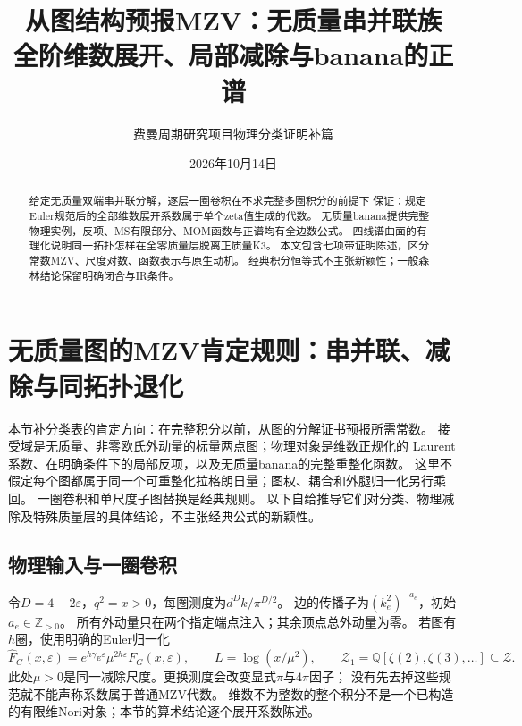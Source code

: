 \documentclass[11pt,a4paper]{ctexart}
\title{从图结构预报MZV：无质量串并联族\\[5pt]
\large 全阶维数展开、局部减除与banana的正谱}
\author{费曼周期研究项目\quad 物理分类证明补篇}
\date{2026年10月14日}
\theoremstyle{cnplain}\newtheorem{theorem}{定理}[section]
\theoremstyle{definition}\newtheorem{definition}[theorem]{定义}
\theoremstyle{remark}\newtheorem{remark}[theorem]{注}
\begin{document}
\maketitle
\begin{abstract}
给定无质量双端串并联分解，逐层一圈卷积在不求完整多圈积分的前提下
保证：规定Euler规范后的全部维数展开系数属于单个zeta值生成的代数。
无质量banana提供完整物理实例，反项、MS有限部分、MOM函数与正谱均有全边数公式。
四线谱曲面的有理化说明同一拓扑怎样在全零质量层脱离正质量K3。
本文包含七项带证明陈述，区分常数MZV、尺度对数、函数表示与原生动机。
经典积分恒等式不主张新颖性；一般森林结论保留明确闭合与IR条件。
\end{abstract}
\tableofcontents\clearpage
\section{无质量图的MZV肯定规则：串并联、减除与同拓扑退化}
\label{sec:masslessmzv}

本节补分类表的肯定方向：在完整积分以前，从图的分解证书预报所需常数。
接受域是无质量、非零欧氏外动量的标量两点图；物理对象是维数正规化的
Laurent系数、在明确条件下的局部反项，以及无质量banana的完整重整化函数。
这里不假定每个图都属于同一个可重整化拉格朗日量；图权、耦合和外腿归一化另行乘回。
一圈卷积和单尺度子图替换是经典规则\cite[式(1.2.1)、\S5.2.1]{PanzerMZV}。
以下自给推导它们对分类、物理减除及特殊质量层的具体结论，不主张经典公式的新颖性。

\subsection{物理输入与一圈卷积}
令$D=4-2\varepsilon$，$q^2=x>0$，每圈测度为$d^Dk/\pi^{D/2}$。
边的传播子为$(k_e^2)^{-a_e}$，初始$a_e\in\mathbb Z_{>0}$。
所有外动量只在两个指定端点注入；其余顶点总外动量为零。
若图有$h$圈，使用明确的Euler归一化
\[
 \widehat F_G(x,\varepsilon)
 =e^{h\gamma_E\varepsilon}\mu^{2h\varepsilon}F_G(x,\varepsilon),
 \qquad L=\log(x/\mu^2),\qquad
 \mathcal Z_1=\mathbb Q[\zeta(2),\zeta(3),\ldots]\subseteq\mathcal Z.
\]
此处$\mu>0$是同一减除尺度。更换测度会改变显式$\pi$与$4\pi$因子；
没有先去掉这些规范就不能声称系数属于普通MZV代数。
维数不为整数的整个积分不是一个已构造的有限维Nori对象；本节的算术结论逐个展开系数陈述。
\end{document}
